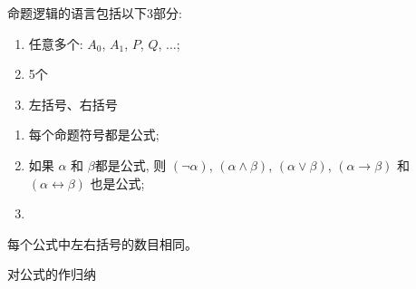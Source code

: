 \begin{frame}{}
  \begin{definition}[命题逻辑的语言]
    命题逻辑的语言包括以下3部分:
    \begin{enumerate}[(1)]
      \setlength{\itemsep}{5pt}
      \item 任意多个: $A_{0}$, $A_{1}$, $P$, $Q$, $\dots$;
      \item 5个
        
      \item 左括号、右括号
    \end{enumerate}
  \end{definition}
\end{frame}

\begin{frame}{}
  \begin{definition}[公式 (Formula)]
    \begin{enumerate}[(1)]
      \setlength{\itemsep}{8pt}
      \item 每个命题符号都是公式;
      \item 如果 $\alpha$ 和 $\beta$都是公式,
        则 $(\lnot \alpha)$, $(\alpha \land \beta)$, $(\alpha \lor \beta)$,
        $(\alpha \to \beta)$ 和 $(\alpha \leftrightarrow \beta)$ 也是公式;
      \item {}
    \end{enumerate}
  \end{definition}
\end{frame}

\begin{frame}{}
  \begin{lemma}[公式的括号匹配性质]
    每个公式中左右括号的数目相同。
  \end{lemma}

  \pause
  \vspace{0.60cm}
  \begin{center}

    \pause
    \vspace{0.50cm}
    {\large 对公式的作归纳}
  \end{center}
\end{frame}

